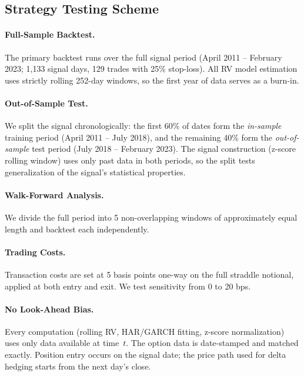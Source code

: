 \documentclass[11pt,a4paper]{article}
\begin{document}
\subsection{Strategy Testing Scheme}

\paragraph{Full-Sample Backtest.}
The primary backtest runs over the full signal period (April 2011 -- February 2023; 1,133 signal days, 129 trades with 25\% stop-loss).
All RV model estimation uses strictly rolling 252-day windows, so the first year of data serves as a burn-in.

\paragraph{Out-of-Sample Test.}
We split the signal chronologically: the first 60\% of dates form the \emph{in-sample} training period (April 2011 -- July 2018), and the remaining 40\% form the \emph{out-of-sample} test period (July 2018 -- February 2023).
The signal construction (z-score rolling window) uses only past data in both periods, so the split tests generalization of the signal's statistical properties.

\paragraph{Walk-Forward Analysis.}
We divide the full period into 5 non-overlapping windows of approximately equal length and backtest each independently.

\paragraph{Trading Costs.}
Transaction costs are set at 5 basis points one-way on the full straddle notional, applied at both entry and exit.
We test sensitivity from 0 to 20 bps.

\paragraph{No Look-Ahead Bias.}
Every computation (rolling RV, HAR/GARCH fitting, z-score normalization) uses only data available at time~$t$.
The option data is date-stamped and matched exactly.
Position entry occurs on the signal date; the price path used for delta hedging starts from the next day's close.


\end{document}
